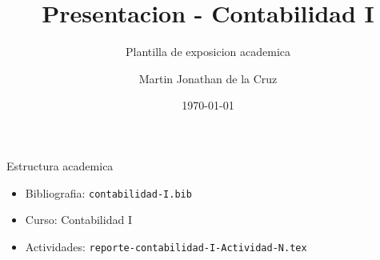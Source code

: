 \documentclass[spanish,aspectratio=169]{beamer}
\title{Presentacion - Contabilidad I}
\subtitle{Plantilla de exposicion academica}
\author{Martin Jonathan de la Cruz}
\institute{Universidad Ciudadana de Nuevo Leon}
\date{\today}
\begin{document}
\begin{frame}
  \titlepage
\end{frame}

\begin{frame}{Estructura academica}
  \begin{itemize}
    \item Bibliografia: \texttt{contabilidad-I.bib}
    \item Curso: Contabilidad I
    \item Actividades: \texttt{reporte-contabilidad-I-Actividad-N.tex}
  \end{itemize}
\end{frame}
\end{document}
